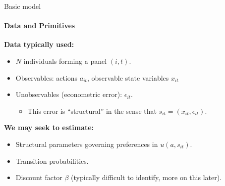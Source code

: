 \documentclass[11pt,aspectratio=169]{beamer}
\begin{document}
\begin{frame}{Basic model}
\framesubtitle{Data and Primitives}

	\small 
	
	\textbf{Data typically used:}
	
	\begin{itemize}
		\item $N$ individuals forming a panel $(i,t)$.
		\item Observables: actions $a_{it}$, observable state variables $x_{it}$
		\item Unobservables (econometric error): $\epsilon_{it}$.
			\begin{itemize}
				\item This error is ``structural'' in the sense that $s_{it} = (x_{it},\epsilon_{it})$.
			\end{itemize}
	\end{itemize}
	
	\textbf{We may seek to estimate:}
	
	\begin{itemize}
		\item Structural parameters governing preferences in $u(a,s_{it})$.
		\item Transition probabilities.
		\item Discount factor $\beta$ (typically difficult to identify, more on this later).
	\end{itemize}
	
\end{frame}
\end{document}
